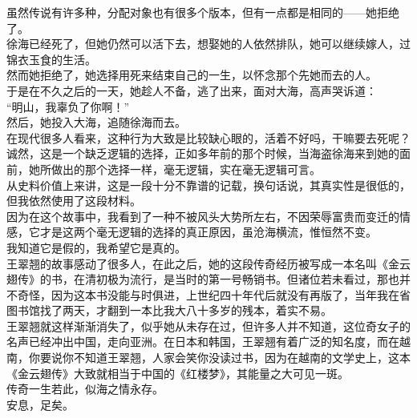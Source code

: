 \begin{multicols}{\theparacolNo}
虽然传说有许多种，分配对象也有很多个版本，但有一点都是相同的——她拒绝了。\\

徐海已经死了，但她仍然可以活下去，想娶她的人依然排队，她可以继续嫁人，过锦衣玉食的生活。\\

然而她拒绝了，她选择用死来结束自己的一生，以怀念那个先她而去的人。\\

于是在不久之后的一天，她趁人不备，逃了出来，面对大海，高声哭诉道：\\

“明山，我辜负了你啊！”\\

然后，她投入大海，追随徐海而去。\\

在现代很多人看来，这种行为大致是比较缺心眼的，活着不好吗，干嘛要去死呢？\\

诚然，这是一个缺乏逻辑的选择，正如多年前的那个时候，当海盗徐海来到她的面前，她所做出的那个选择一样，毫无逻辑，实在毫无逻辑可言。\\

从史料价值上来讲，这是一段十分不靠谱的记载，换句话说，其真实性是很低的，但我依然使用了这段材料。\\

因为在这个故事中，我看到了一种不被风头大势所左右，不因荣辱富贵而变迁的情感，它才是这两个毫无逻辑的选择的真正原因，虽沧海横流，惟恒然不变。\\

我知道它是假的，我希望它是真的。\\

王翠翘的故事感动了很多人，在此之后，她的这段传奇经历被写成一本名叫《金云翅传》的书，在清初极为流行，是当时的第一号畅销书。但诸位若未看过，那也并不奇怪，因为这本书没能与时俱进，上世纪四十年代后就没有再版了，当年我在省图书馆找了两天，才翻到一本比我大八十多岁的残本，着实不易。\\

王翠翘就这样渐渐消失了，似乎她从未存在过，但许多人并不知道，这位奇女子的名声已经冲出中国，走向亚洲。在日本和韩国，王翠翘有着广泛的知名度，而在越南，你要说你不知道王翠翘，人家会笑你没读过书，因为在越南的文学史上，这本《金云翅传》大致就相当于中国的《红楼梦》，其能量之大可见一斑。\\

传奇一生若此，似海之情永存。\\

安息，足矣。\\


\end{multicols}
